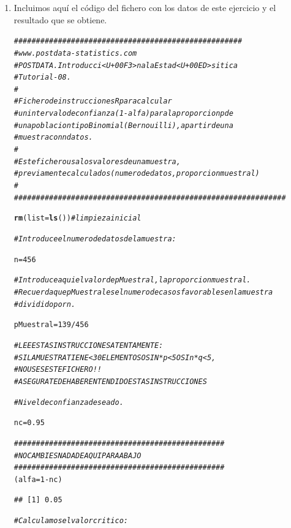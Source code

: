 \documentclass[10pt,a4paper]{article}\usepackage[]{graphicx}\usepackage[]{color}
\makeatletter
\newcommand{\hlnum}[1]{\textcolor[rgb]{0.686,0.059,0.569}{#1}}%
\newcommand{\hlcom}[1]{\textcolor[rgb]{0.678,0.584,0.686}{\textit{#1}}}%
\newcommand{\hlopt}[1]{\textcolor[rgb]{0,0,0}{#1}}%
\newcommand{\hlstd}[1]{\textcolor[rgb]{0.345,0.345,0.345}{#1}}%
\newcommand{\hlkwb}[1]{\textcolor[rgb]{0.69,0.353,0.396}{#1}}%
\newcommand{\hlkwc}[1]{\textcolor[rgb]{0.333,0.667,0.333}{#1}}%
\newcommand{\hlkwd}[1]{\textcolor[rgb]{0.737,0.353,0.396}{\textbf{#1}}}%
\newenvironment{kframe}{%
 \def\at@end@of@kframe{}%
 \ifinner\ifhmode%
  \def\at@end@of@kframe{\end{minipage}}%
  \begin{minipage}{\columnwidth}%
 \fi\fi%
 \def\FrameCommand##1{\hskip\@totalleftmargin \hskip-\fboxsep
 \colorbox{shadecolor}{##1}\hskip-\fboxsep
     \hskip-\linewidth \hskip-\@totalleftmargin \hskip\columnwidth}%
 \MakeFramed {\advance\hsize-\width
   \@totalleftmargin\z@ \linewidth\hsize
   \@setminipage}}%
 {\par\unskip\endMakeFramed%
 \at@end@of@kframe}
\newenvironment{knitrout}{}{} %
\makeatother
\begin{document}
\begin{enumerate}
  \item Incluimos aquí el código del fichero con los datos de este ejercicio y el resultado que se obtiene.

\begin{knitrout}
\color{fgcolor}\begin{kframe}
\begin{alltt}
\hlcom{####################################################}
\hlcom{# www.postdata-statistics.com}
\hlcom{# POSTDATA. Introducci<U+00F3>n a la Estad<U+00ED>sitica}
\hlcom{# Tutorial-08.}
\hlcom{#}
\hlcom{# Fichero de instrucciones R para calcular}
\hlcom{# un intervalo de confianza (1-alfa) para la proporcion p de}
\hlcom{# una poblacion tipo Binomial (Bernouilli), a partir de una}
\hlcom{# muestra con n datos.}
\hlcom{#}
\hlcom{# Este fichero usa los valores de una muestra,}
\hlcom{# previamente calculados (numero de datos, proporcion muestral)}
\hlcom{#}
\hlcom{##############################################################}

\hlkwd{rm}\hlstd{(}\hlkwc{list}\hlstd{=}\hlkwd{ls}\hlstd{())} \hlcom{#limpieza inicial}

\hlcom{# Introduce el numero de datos de la muestra:}

\hlstd{n} \hlkwb{=} \hlnum{456}

\hlcom{# Introduce aqui el valor de pMuestral, la proporcion muestral .}
\hlcom{# Recuerda que pMuestral es el numero de casos favorables en la muestra}
\hlcom{# dividido por n.}

\hlstd{pMuestral} \hlkwb{=} \hlnum{139} \hlopt{/} \hlnum{456}

\hlcom{# LEE ESTAS INSTRUCCIONES ATENTAMENTE:}
\hlcom{# SI LA MUESTRA TIENE < 30 ELEMENTOS O SI N*p<5 O SI n*q<5,}
\hlcom{# NO USES ESTE FICHERO!!}
\hlcom{# ASEGURATE DE HABER ENTENDIDO ESTAS INSTRUCCIONES}

\hlcom{# Nivel de confianza deseado.}

\hlstd{nc} \hlkwb{=} \hlnum{0.95}

\hlcom{################################################}
\hlcom{#NO CAMBIES NADA DE AQUI PARA ABAJO}
\hlcom{################################################}
\hlstd{(alfa} \hlkwb{=} \hlnum{1} \hlopt{-} \hlstd{nc )}
\end{alltt}
\begin{verbatim}
## [1] 0.05
\end{verbatim}
\begin{alltt}
\hlcom{# Calculamos el valor critico:}


\end{alltt}
\end{kframe}
\end{knitrout}
\end{enumerate}
\end{document}
